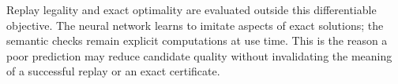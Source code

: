 Replay legality and exact optimality are evaluated outside this differentiable objective. The neural network learns to imitate aspects of exact solutions; the semantic checks remain explicit computations at use time. This is the reason a poor prediction may reduce candidate quality without invalidating the meaning of a successful replay or an exact certificate.

